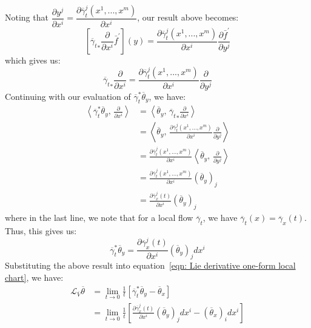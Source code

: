         Noting that $\dfrac{\partial y^j}{\partial x^i} = \dfrac{\partial
        \overline{\gamma}_t^j(x^1,...,x^m)}{\partial x^i}$, our result above
        becomes:
        \[\left[{\overline{\gamma}_t}_*\frac{\partial}{\partial x^i}
        \bar{f}^\prime\right](y) = \frac{\partial
        \overline{\gamma}_t^j(x^1,...,x^m)}{\partial x^i}\frac{\partial
        \bar{f}^\prime}{\partial y^j}\]
        which gives us:
        \[{\overline{\gamma}_t}_*\frac{\partial}{\partial x^i} =
        \frac{\partial \overline{\gamma}_t^j(x^1,...,x^m)}{\partial
        x^i}\frac{\partial }{\partial y^j}\]
        Continuing with our evaluation of $\overline{\gamma}_t^*
        \overline{\theta}_y$, we have:
        \begin{align*}
          \left\langle \overline{\gamma}_t^* \overline{\theta}_y, \,
          \frac{\partial}{\partial x^i} \right\rangle
          &= \left\langle  \overline{\theta}_y, \,
          {\overline{\gamma}_t}_*\frac{\partial}{\partial x^i} \right\rangle \\
          &=\left\langle\overline{\theta}_y, \,\frac{\partial
          \overline{\gamma}_t^j(x^1,...,x^m)}{\partial x^i}\frac{\partial
          }{\partial y^j} \right\rangle \\
          &= \frac{\partial \overline{\gamma}_t^j(x^1,...,x^m)}{\partial
          x^i}\left\langle\overline{\theta}_y, \,\frac{\partial }{\partial
          y^j} \right\rangle \\
          &= \frac{\partial \overline{\gamma}_t^j(x^1,...,x^m)}{\partial
          x^i} \left(\overline{\theta}_y\right)_j \\
          &=\frac{\partial \overline{\gamma}_x^j(t)}{\partial
          x^i} \left(\overline{\theta}_y\right)_j
        \end{align*}
        where in the last line, we note that for a local flow
        $\overline{\gamma}_t$, we have $\overline{\gamma}_t(x) =
        \overline{\gamma}_x(t)$. Thus, this gives us: \[\overline{\gamma}_t^*
        \overline{\theta}_y = \frac{\partial
        \overline{\gamma}_x^j(t)}{\partial x^i}
        \left(\overline{\theta}_y\right)_j dx^i \]
        Substituting the above result into equation~\ref{eqn: Lie derivative
        one-form local chart}, we have:
        \begin{align*}
          \mathcal{L}_{\overline{V}} \overline{\theta} &= \lim_{t\to
          0}\frac{1}{t}\left[\overline{\gamma}_t^* \overline{\theta}_y -
          \overline{\theta}_x\right] \\ &=\lim_{t\to
          0}\frac{1}{t}\left[\frac{\partial
          \overline{\gamma}_x^j(t)}{\partial x^i}
          \left(\overline{\theta}_y\right)_j dx^i -
          \left(\overline{\theta}_x\right)_i dx^i\right]
        \end{align*}
